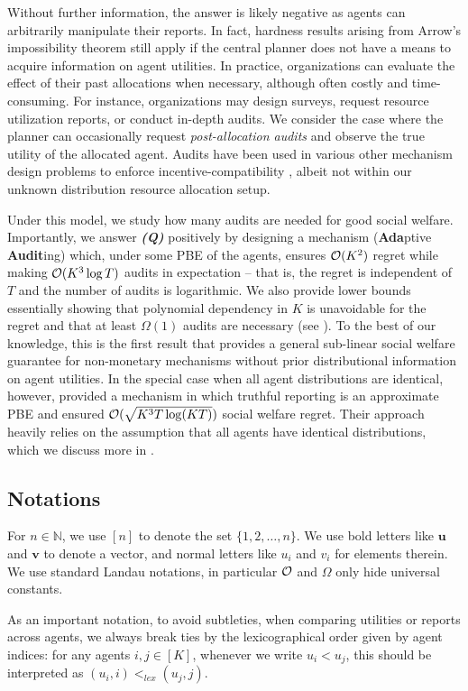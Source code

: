 Without further information, the answer is likely negative as agents can arbitrarily manipulate their reports. In fact, hardness results arising from Arrow's impossibility theorem still apply if the central planner does not have a means to acquire information on agent utilities. In practice, organizations can evaluate the effect of their past allocations when necessary, although often costly and time-consuming. For instance, organizations may design surveys, request resource utilization reports, or conduct in-depth audits. We consider the case where the planner can occasionally request \emph{post-allocation audits} and observe the true utility of the allocated agent. Audits have been used in various other mechanism design problems to enforce incentive-compatibility \citep{lundy2019allocation,jalota2024catch}, albeit not within our unknown distribution resource allocation setup.

Under this model, we study how many audits are needed for good social welfare. Importantly, we answer \textit{\textbf{(Q)}} positively by designing a mechanism \mechname (\textbf{Ada}ptive \textbf{Audit}ing) which, under some PBE of the agents, ensures $\operatorname{\mathcal O}(K^2)$ regret while making $\operatorname{\mathcal O}(K^3\log T)$ audits in expectation -- that is, the regret is independent of $T$ and the number of audits is logarithmic. We also provide lower bounds essentially showing that polynomial dependency in $K$ is unavoidable for the regret and that at least $\Omega(1)$ audits are necessary (see ). To the best of our knowledge, this is the first result that provides a general sub-linear social welfare guarantee for non-monetary mechanisms without prior distributional information on agent utilities. In the special case when all agent distributions are identical, however, \citet{yin2022online} provided a mechanism in which truthful reporting is an approximate PBE and ensured $\operatorname{\mathcal O}(\sqrt{K^3 T \log(KT)})$ social welfare regret. Their approach heavily relies on the assumption that all agents have identical distributions, which we discuss more in .


\subsection{Notations}\label{footnote:break ties} For $n\in\mathbb N$, we use $[n]$ to denote the set $\{1,2,\ldots,n\}$.
We use bold letters like $\bm u$ and $\bm v$ to denote a vector, and normal letters like $u_i$ and $v_i$ for elements therein.
We use standard Landau notations, in particular $\operatorname{\mathcal O}$ and $\Omega$ only hide universal constants.

As an important notation, to avoid subtleties, when comparing utilities or reports across agents, we always break ties by the lexicographical order given by agent indices: for any agents $i,j\in[K]$, whenever we write $u_i<u_j$, this should be interpreted as $(u_i,i)<_{lex} (u_j,j)$.

